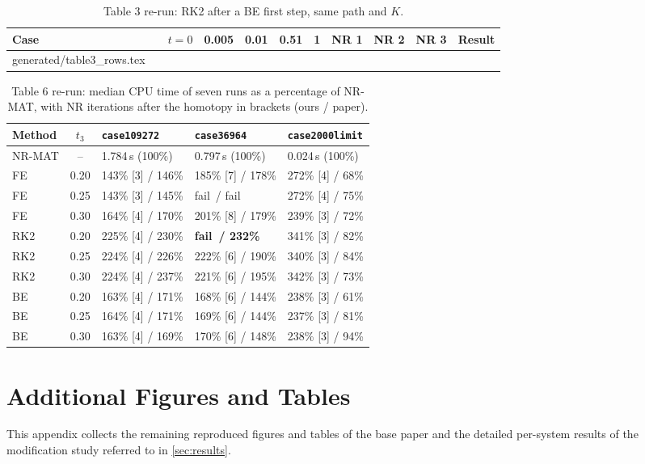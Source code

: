 \documentclass[sigconf,nonacm]{acmart}
\makeatletter
\newcommand{\rows}[1]{\@@input #1 }
\newcommand{\thead}[1]{\textbf{#1}}
\newcommand{\fail}{\textcolor{failred}{fail}}
\newcommand{\code}[1]{\texttt{#1}}
\makeatother
\begin{document}
\begin{table}[!htbp]
\centering
\caption{Table 3 re-run: RK2 after a BE first step, same path and $K$.}
\label{tab:rk2}
\scriptsize
\setlength{\tabcolsep}{4pt}
\begin{tabular}{@{}l l r r r r r r r r l@{}}
\toprule
\thead{Case} & & \thead{$t{=}0$} & \thead{0.005} & \thead{0.01} & \thead{0.51} & \thead{1} & \thead{NR 1} & \thead{NR 2} & \thead{NR 3} & \thead{Result} \\
\midrule
\rows{generated/table3_rows.tex}
\bottomrule
\end{tabular}
\end{table}

\begin{table}[!htbp]
\centering
\caption{Table 6 re-run: median CPU time of seven runs as a percentage of NR-MAT, with NR iterations after
the homotopy in brackets (ours / paper).}
\label{tab:t6}
\footnotesize
\setlength{\tabcolsep}{6pt}
\begin{tabular}{@{}l c l l l@{}}
\toprule
\thead{Method} & \thead{$t_3$} & \thead{\code{case109272}} & \thead{\code{case36964}} & \thead{\code{case2000limit}} \\
\midrule
NR-MAT & -- & 1.784\,s (100\%) & 0.797\,s (100\%) & 0.024\,s (100\%) \\
\midrule
FE  & 0.20 & 143\% [3] / 146\% & 185\% [7] / 178\% & 272\% [4] / 68\% \\
FE  & 0.25 & 143\% [3] / 145\% & \fail\ / \fail & 272\% [4] / 75\% \\
FE  & 0.30 & 164\% [4] / 170\% & 201\% [8] / 179\% & 239\% [3] / 72\% \\
RK2 & 0.20 & 225\% [4] / 230\% & \textbf{\fail\ / 232\%} & 341\% [3] / 82\% \\
RK2 & 0.25 & 224\% [4] / 226\% & 222\% [6] / 190\% & 340\% [3] / 84\% \\
RK2 & 0.30 & 224\% [4] / 237\% & 221\% [6] / 195\% & 342\% [3] / 73\% \\
BE  & 0.20 & 163\% [4] / 171\% & 168\% [6] / 144\% & 238\% [3] / 61\% \\
BE  & 0.25 & 164\% [4] / 171\% & 169\% [6] / 144\% & 237\% [3] / 81\% \\
BE  & 0.30 & 163\% [4] / 169\% & 170\% [6] / 148\% & 238\% [3] / 94\% \\
\bottomrule
\end{tabular}
\end{table}

\FloatBarrier
\section{Additional Figures and Tables}\label{app:extra}
This appendix collects the remaining reproduced figures and tables of the base paper and the
detailed per-system results of the modification study referred to in \cref{sec:results}.
\end{document}
